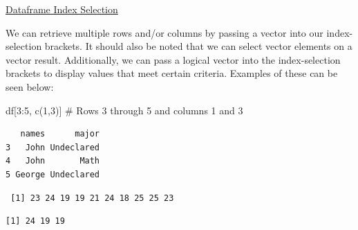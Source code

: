 \documentclass[
  letterpaper,
  DIV=11,
  numbers=noendperiod]{scrreprt}
\newenvironment{Shaded}{\begin{snugshade}}{\end{snugshade}}
\newcommand{\CommentTok}[1]{\textcolor[rgb]{0.37,0.37,0.37}{#1}}
\newcommand{\DecValTok}[1]{\textcolor[rgb]{0.68,0.00,0.00}{#1}}
\newcommand{\FunctionTok}[1]{\textcolor[rgb]{0.28,0.35,0.67}{#1}}
\newcommand{\NormalTok}[1]{\textcolor[rgb]{0.00,0.23,0.31}{#1}}
\newcommand{\SpecialCharTok}[1]{\textcolor[rgb]{0.37,0.37,0.37}{#1}}
\begin{document}
\begin{watch}{}{}
    \href{https://youtu.be/Sgaa-F_HEYo}{Dataframe Index Selection}
\end{watch}

We can retrieve multiple rows and/or columns by passing a vector into
our index-selection brackets. It should also be noted that we can select
vector elements on a vector result. Additionally, we can pass a logical
vector into the index-selection brackets to display values that meet
certain criteria. Examples of these can be seen below:

\begin{Shaded}
\begin{Highlighting}[]
\NormalTok{df[}\DecValTok{3}\SpecialCharTok{:}\DecValTok{5}\NormalTok{, }\FunctionTok{c}\NormalTok{(}\DecValTok{1}\NormalTok{,}\DecValTok{3}\NormalTok{)] }\CommentTok{\# Rows 3 through 5 and columns 1 and 3 }
\end{Highlighting}
\end{Shaded}

\begin{verbatim}
   names      major
3   John Undeclared
4   John       Math
5 George Undeclared
\end{verbatim}

\begin{Shaded}
\end{Shaded}

\begin{verbatim}
 [1] 23 24 19 19 21 24 18 25 25 23
\end{verbatim}

\begin{Shaded}
\end{Shaded}

\begin{verbatim}
[1] 24 19 19
\end{verbatim}

\begin{Shaded}
\end{Shaded}
\end{document}
